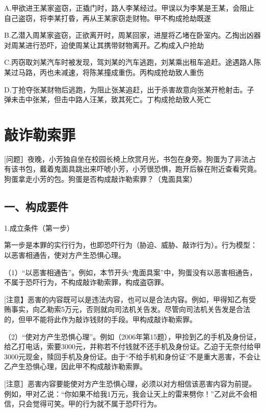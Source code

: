 A.甲欲进王某家盗窃，正撬门时，路人李某经过。甲误以为李某是王某，会阻止自己盗窃，将李某打昏，再从王某家窃走财物。甲不构成抢劫既遂

B.乙潜入周某家盗窃，正欲离开时，周某回家，进屋将乙堵在卧室内。乙掏出凶器对周某进行恐吓，迫使周某让其携带财物离开。乙构成入户抢劫

C.丙窃取刘某汽车时被发现，驾刘某的汽车逃跑，刘某乘出租车追赶。途遇路人陈某过马路，丙也未减速，将陈某撞成重伤。丙构成抢劫致人重伤

D.丁抢夺张某财物后逃跑，为阻止张某追赶，出于杀害故意向张某开枪射击。子弹未击中张某，但击中路人汪某，致其死亡。丁构成抢劫致人死亡

\section{敲诈勒索罪}

[问题］夜晚，小芳独自坐在校园长椅上欣赏月光，书包在身旁。狗蛋为了非法占有该书包，戴着鬼面具跳出来吓唬小芳，小芳很恐惧，跑开后躲在附近查看究竟。狗蛋拿走小芳的包。狗蛋是否构成敲诈勒索罪？（鬼面具案）

\subsection*{一、构成要件}


1.成立条件（第一步）

第一步是本罪的实行行为，也即恐吓行为（胁迫、威胁、敲诈行为）。行为模型：以恶害相通告，使对方产生恐惧心理。

（1）“以恶害相通告”。例如，本节开头“鬼面具案”中，狗蛋没有以恶害相通告，不属于恐吓行为，不构成敲诈勒索罪，构成盗窃罪。

[注意】恶害的内容既可以是违法内容，也可以是合法内容。例如，甲得知乙有受贿事实，向乙勒索5万元，否则就向司法机关告发。尽管向司法机关告发是合法的，但甲不能将此作为敲诈钱财的手段。甲构成敲诈勒索罪。

（2）“使对方产生恐惧心理”。例如（2006年第15题），甲捡到乙的手机及身份证，给乙打电话，索要3000元，并称若不付钱就不还手机及身份证。乙迫于无奈付给甲3000元现金，赎回手机及身份证。由于“不给手机和身份证”不是重大恶害，不会让乙产生恐惧心理，因此甲不构成敲诈勒索罪。

[注意］恶害内容要能使对方产生恐惧心理，必须以对方相信该恶害内容为前提。例如，甲对乙说：“你如果不给我1万元，我会让天上的雷来劈你！”乙对此不会相信，只会觉得可笑。甲的行为就不属于恐吓行为。

